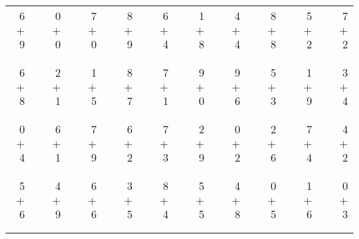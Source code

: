 \documentclass[12pt, letterpaper]{article}
\begin{document}
\begin{tabular}{rrrrrrrrrrrrrrrrrrr}
6 & & 0 & & 7 & & 8 & & 6 & & 1 & & 4 & & 8 & & 5 & & 7\\
$+$ 9 & & $+$ 0 & & $+$ 0 & & $+$ 9 & & $+$ 4 & & $+$ 8 & & $+$ 4 & & $+$ 8 & & $+$ 2 & & $+$ 2\\
\cline{1-1} \cline{3-3} \cline{5-5} \cline{7-7} \cline{9-9} \cline{11-11} \cline{13-13} \cline{15-15} \cline{17-17} \cline{19-19} \\ \\
6 & & 2 & & 1 & & 8 & & 7 & & 9 & & 9 & & 5 & & 1 & & 3\\
$+$ 8 & & $+$ 1 & & $+$ 5 & & $+$ 7 & & $+$ 1 & & $+$ 0 & & $+$ 6 & & $+$ 3 & & $+$ 9 & & $+$ 4\\
\cline{1-1} \cline{3-3} \cline{5-5} \cline{7-7} \cline{9-9} \cline{11-11} \cline{13-13} \cline{15-15} \cline{17-17} \cline{19-19} \\ \\
0 & & 6 & & 7 & & 6 & & 7 & & 2 & & 0 & & 2 & & 7 & & 4\\
$+$ 4 & & $+$ 1 & & $+$ 9 & & $+$ 2 & & $+$ 3 & & $+$ 9 & & $+$ 2 & & $+$ 6 & & $+$ 4 & & $+$ 2\\
\cline{1-1} \cline{3-3} \cline{5-5} \cline{7-7} \cline{9-9} \cline{11-11} \cline{13-13} \cline{15-15} \cline{17-17} \cline{19-19} \\ \\
5 & & 4 & & 6 & & 3 & & 8 & & 5 & & 4 & & 0 & & 1 & & 0\\
$+$ 6 & & $+$ 9 & & $+$ 6 & & $+$ 5 & & $+$ 4 & & $+$ 5 & & $+$ 8 & & $+$ 5 & & $+$ 6 & & $+$ 3\\
\cline{1-1} \cline{3-3} \cline{5-5} \cline{7-7} \cline{9-9} \cline{11-11} \cline{13-13} \cline{15-15} \cline{17-17} \cline{19-19} \\ \\
\end{tabular}
\newpage
\end{document}
